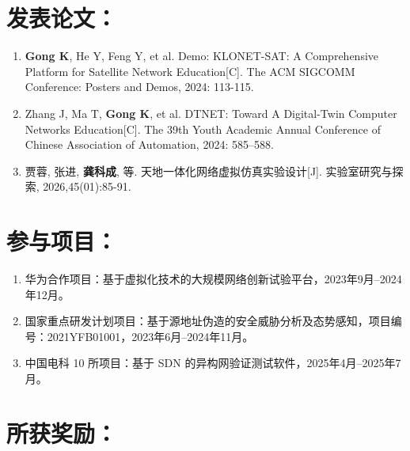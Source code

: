 \section*{发表论文：}


\begin{enumerate}
	\item \textbf{Gong K}, He Y, Feng Y, et al. Demo: KLONET-SAT: A Comprehensive Platform for Satellite Network Education[C]. The ACM SIGCOMM Conference: Posters and Demos, 2024: 113-115.
	\item Zhang J, Ma T, \textbf{Gong K}, et al. DTNET: Toward A Digital-Twin Computer Networks Education[C]. The 39th Youth Academic Annual Conference of Chinese Association of Automation, 2024: 585--588.
	\item 贾蓉, 张进, \textbf{龚科成}, 等. 天地一体化网络虚拟仿真实验设计[J]. 实验室研究与探索, 2026,45(01):85-91.
\end{enumerate}

\section*{参与项目：}

\begin{enumerate}
	\item 华为合作项目：基于虚拟化技术的大规模网络创新试验平台，2023年9月--2024年12月。
	\item 国家重点研发计划项目：基于源地址伪造的安全威胁分析及态势感知，项目编号：2021YFB01001，2023年6月--2024年11月。
	\item 中国电科 10 所项目：基于 SDN 的异构网验证测试软件，2025年4月--2025年7月。
\end{enumerate}

\section*{所获奖励：}

